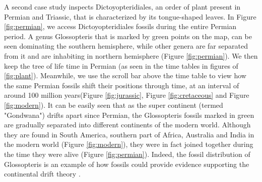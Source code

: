 \documentclass[11pt, a4paper,oneside,chapterprefix=false]{scrbook}
\begin{document}
A second case study inspects Dictoyopteridiales, an order of plant present in Permian and Triassic, that is characterized by its tongue-shaped leaves. In Figure \ref{fig:permian}, we access Dictoyopteridiales fossils during the entire Permian period. A genus Glossopteris that is marked by green points on the map, can be seen dominating the southern hemisphere, while other genera are far separated from it and are inhabiting in northern hemisphere (Figure \ref{fig:permian}). We then keep the tree of life time in Permian (as seen in the time tables in figures of \ref{fig:plant}). Meanwhile, we use the scroll bar above the time table to view how the same Permian fossils shift their positions through time, at an interval of around 100 million years(Figure \ref{fig:jurassic}, Figure \ref{fig:cretaceous} and Figure \ref{fig:modern}). It can be easily seen that as the super continent (termed "Gondwana") drifts apart since Permian, the Glossopteris fossils marked in green are gradually separated into different continents of the modern world. Although they are found in South America, southern part of Africa, Australia and India in the modern world (Figure \ref{fig:modern}), they were in fact joined together during the time they were alive (Figure \ref{fig:permian}). Indeed, the fossil distribution of Glossopteris is an example of how fossils could provide evidence supporting the continental drift theory \cite{schopf1970relation}. 
\end{document}
